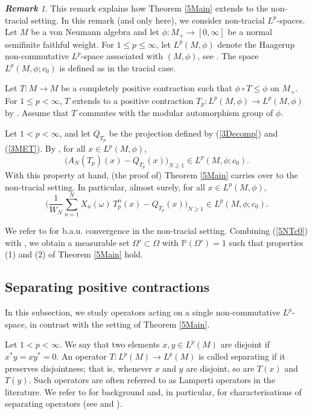\documentclass[12pt]{amsart}
\newcommand{\Pdb}{\mbox{$\mathbb{P}$}}
\theoremstyle{remark}
\newtheorem{remark}[theorem]{\bf Remark}
\theoremstyle{definition}
\numberwithin{equation}{section}
\begin{document}
\begin{remark}
This remark explains how
Theorem \ref{5Main} extends to the non-tracial setting. 
In this remark (and only here), we consider non-tracial
$L^p$-spaces. Let $M$ be a von Neumann algebra and let
$\phi\colon M_+\to[0,\infty]$ be a normal semifinite faithful weight.
For $1\leq p\leq\infty$, let $L^p(M,\phi)$ denote the Haagerup
non-commutative $L^p$-space associated with $(M,\phi)$, see
\cite{HJX,Hiai,Terp0}. The space $L^p(M,\phi;c_0)$ is defined as in the tracial case.

Let $T\colon M\to M$ be a completely positive contraction such that $\phi\circ T\leq\phi$ on $M_+$. For $1\leq p<\infty$, $T$ extends to a positive contraction
$T_p\colon L^p(M,\phi)\to L^p(M,\phi)$ by \cite[Theorem 5.1 $\&$ Remark 5.6]{HJX}.
Assume that $T$ commutes with the modular automorphism group of $\phi$.


Let $1<p<\infty$, and let $Q_{T_p}$ be the projection defined by (\ref{3Decomp}) and (\ref{3MET}). By \cite[Theorem 7.11]{JX}, for all $x\in L^p(M,\phi)$,
\[
\bigl(A_N(T_p)(x) - Q_{T_p}(x)\bigr)_{N\geq 1} \in L^p(M,\phi;c_0).
\]
With this property at hand, (the proof of) Theorem \ref{5Main} carries over to the non-tracial setting. In particular, almost surely, for all $x\in L^p(M,\phi)$,
\begin{equation}\label{5NTc0}
\biggl(\frac{1}{W_N}\sum_{n=1}^N X_n(\omega)\, T_p^n(x) - Q_{T_p}(x)\biggr)_{N\geq 1}
\in L^p(M,\phi;c_0).
\end{equation}

We refer to \cite[Definition 7.9]{JX} for b.a.u. convergence in the non-tracial setting. Combining (\ref{5NTc0}) with
\cite[Lemma 7.10]{JX}, we obtain a measurable set $\Omega'\subset \Omega$ with $\Pdb(\Omega')=1$ such that properties (1) and (2) of Theorem \ref{5Main} hold.

\end{remark}




\subsection{Separating positive contractions}
In this subsection, we study operators acting on a single non-commutative $L^p$-space, in contrast with the setting of Theorem \ref{5Main}.

Let $1<p<\infty$. We say that two elements $x, y \in L^p(M)$ are disjoint if $x^*y = xy^* = 0$. An operator $T \colon L^p(M) \to L^p(M)$ is called separating if it preserves disjointness; that is, whenever $x$ and $y$ are disjoint, so are $T(x)$ and $T(y)$. Such operators are often referred to as Lamperti operators in the literature. We refer to \cite{HRW,LMZ} for background and, in particular, for characterisations of separating operators (see \cite[Theorem 3.1]{LMZ} and \cite[Theorem 3.3]{HRW}).
\end{document}
